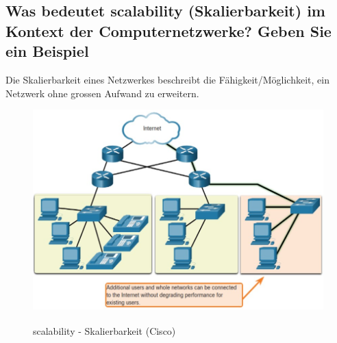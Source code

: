 \subsection*{Was bedeutet \flqq scalability\frqq{} (Skalierbarkeit) im Kontext der Computernetzwerke? Geben Sie ein Beispiel}
Die Skalierbarkeit eines Netzwerkes beschreibt die Fähigkeit/Möglichkeit, ein Netzwerk ohne grossen Aufwand zu erweitern.
\begin{figure}[H]
    \begin{center}
    \label{pic:scalability}
    \includegraphics[width=\textwidth]{images/scalability.jpg}
    \caption{scalability - Skalierbarkeit (\textsuperscript{\textcopyright}Cisco)}
    \end{center}
\end{figure}

